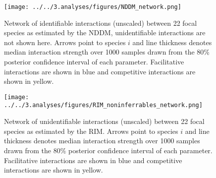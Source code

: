     \begin{figure}[H]
        \texttt{[image: ../../3.analyses/figures/NDDM\_network.png]}
        \caption{Network of identifiable interactions (unscaled) between 22 focal species as estimated by the NDDM, unidentifiable interactions are not shown here. Arrows point to species $i$ and line thickness denotes median interaction strength over 1000 samples drawn from the 80\% posterior confidence interval of each parameter. Facilitative interactions are shown in blue and competitive interactions are shown in yellow.}
        \label{fig:jointnetwork}
    \end{figure}

    \begin{figure}[H]
        \texttt{[image: ../../3.analyses/figures/RIM\_noninferrables\_network.png]}
        \caption{Network of unidentifiable interactions (unscaled) between 22 focal species as estimated by the RIM. Arrows point to species $i$ and line thickness denotes median interaction strength over 1000 samples drawn from the 80\% posterior confidence interval of each parameter. Facilitative interactions are shown in blue and competitive interactions are shown in yellow.}
        \label{fig:jointnetwork}
    \end{figure}

